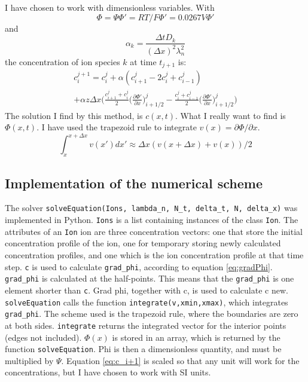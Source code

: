 \documentclass{article}
\begin{document}
I have chosen to work with dimensionless variables. With $$\Phi = \Psi\Phi' = RT/F\Phi' = 0.0267V \Phi'$$ and $$\alpha_k = \frac{\Delta t D_k}{(\Delta x)^2 \lambda_n^2}$$ the concentration of ion species $k$ at time $t_{j+1}$ is:
\begin{multline}\label{eq:c_i+1}
 c_i^{j+1}= c_i^j + \alpha(c_{i+1}^j-2c_i^j+c_{i-1}^j)\\ + \alpha z\Delta x \bigg(\frac{c_{i+1}^j+c_i^j}{2} \big(\frac{\partial \Phi'}{\partial x}\big)_{i+1/2}^j-\frac{c_{i}^j+c_{i-1}^j}{2} \big(\frac{\partial \Phi'}{\partial x}\big)_{i+1/2}^j\bigg)
\end{multline}
The solution I find by this method, is $c(x,t)$. What I really want to find is $\Phi(x,t)$. I have used the trapezoid rule to integrate $v(x) =\partial \Phi / \partial x$.
\begin{equation}
\int_x^{x+\Delta x}v(x') dx'  \approx \Delta x ( v(x+\Delta x) + v(x) )/2
\end{equation}

\subsection{Implementation of the numerical scheme}
The solver \texttt{solveEquation(Ions, lambda\_n, N\_t, delta\_t, N, delta\_x)} was implemented in Python.  \texttt{Ions} is a list containing instances of the class \texttt{Ion}. The attributes of an \texttt{Ion} ion are three concentration vectors: one that store the initial concentration profile of the ion, one for temporary storing newly calculated concentration profiles, and one which is the ion concentration profile at that time step. \texttt{c} is used to calculate \texttt{grad\_phi}, according to equation \ref{eq:gradPhi}. \texttt{grad\_phi} is calculated at the half-points. This means that the \texttt{grad\_phi} is one element shorter than \texttt{c}.   Grad phi, together with c, is used to calculate c new. \texttt{solveEquation} calls the function \texttt{integrate(v,xmin,xmax)}, which integrates \texttt{grad\_phi}. The scheme used is the trapezoid rule, where the boundaries are zero at both sides. \texttt{integrate} returns the integrated vector for the interior points (edges not included). $\Phi(x)$ is stored in an array, which is returned by the function \texttt{solveEquation}. Phi is then a dimensionless quantity, and must be multiplied by $\Psi$. Equation \ref{eq:c_i+1} is scaled so that any unit will work for the concentrations, but I have chosen to work with SI units.  
\end{document}
